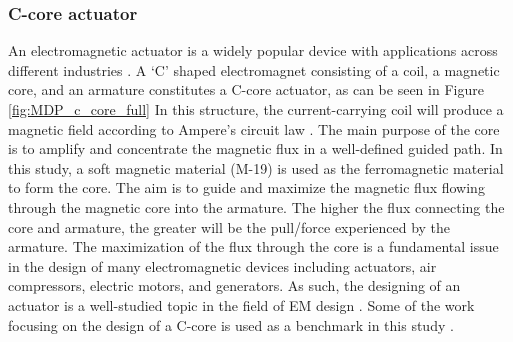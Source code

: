 \subsubsection{C-core actuator}
\label{section:set_seq_c_core}


An electromagnetic actuator is a widely popular device with applications across different industries \parencite{sigmund2001design, choi2009simultaneous, wang2002topology}. A `C’ shaped electromagnet consisting of a coil, a magnetic core, and an armature constitutes a C-core actuator, as can be seen in Figure \ref{fig:MDP_c_core_full} In this structure, the current-carrying coil will produce a magnetic field according to Ampere’s circuit law \parencite{maxwell1861xxv}. The main purpose of the core is to amplify and concentrate the magnetic flux in a well-defined guided path. In this study, a soft magnetic material (M-19) is used as the ferromagnetic material to form the core. The aim is to guide and maximize the magnetic flux flowing through the magnetic core into the armature. The higher the flux connecting the core and armature, the greater will be the pull/force experienced by the armature. The maximization of the flux through the core is a fundamental issue in the design of many electromagnetic devices including actuators, air compressors, electric motors, and generators. As such, the designing of an actuator is a well-studied topic in the field of EM design \parencite{biro2011multi, lim2011topology, lee2012topological, park2012structural, okamoto2015material}. Some of the work focusing on the design of a C-core is used as a benchmark in this study \parencite{park2008magnetic, midha2019selection}.

